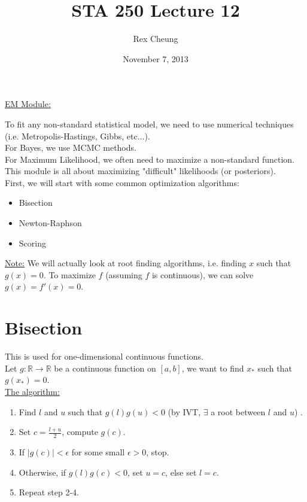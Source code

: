 \documentclass[12pt,a4paper]{article}
\begin{document}
\title{\bf STA 250 Lecture 12}
\author{Rex Cheung}
\date{November 7, 2013}
\maketitle

\begin{center}
\underline{EM Module:}
\end{center}
To fit any non-standard statistical model, we need to use numerical techniques (i.e. Metropolis-Hastings, Gibbs, etc...).\\
For Bayes, we use MCMC methods.\\
For Maximum Likelihood, we often need to maximize a non-standard function.\\
This module is all about maximizing "difficult" likelihoods (or posteriors).\\

First, we will start with some common optimization algorithms:
\begin{itemize}
\item Bisection
\item Newton-Raphson
\item Scoring
\end{itemize}

\noindent \underline{Note:} We will actually look at root finding algorithms, i.e. finding $x$ such that $g(x) = 0$. To maximize $f$ (assuming $f$ is continuous), we can solve $g(x) = f'(x) = 0$.

\section{Bisection}
This is used for one-dimensional continuous functions.\\
Let $g:\mathbb{R} \rightarrow \mathbb{R}$ be a continuous function on $[a,b]$, we want to find $x_*$ such that $g(x_*) = 0$.\\

\noindent \underline{The algorithm:}
\begin{enumerate}
\item Find $l$ and $u$ such that $g(l)g(u) < 0$ (by IVT, $\exists$ a root between $l$ and $u$) .
\item Set $c = \frac{l+u}{2}$, compute $g(c)$.
\item If $|g(c)| < \epsilon$ for some small $\epsilon>0$, stop.
\item Otherwise, if $g(l)g(c) < 0$, set $u = c$, else set $l = c$.
\item Repeat step 2-4.
\end{enumerate}
\end{document}
